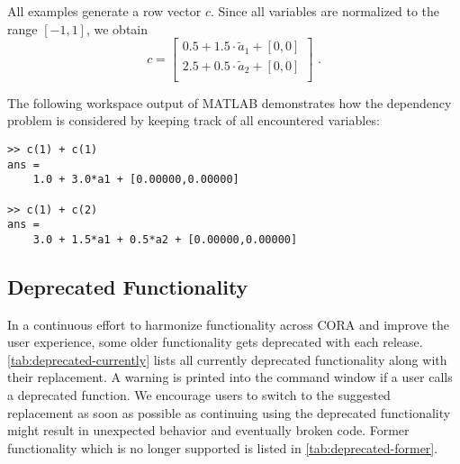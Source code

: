 All examples generate a row vector $c$. Since all variables are normalized to the range $[-1,1]$, we obtain
$$
c =
\begin{bmatrix}
    0.5 + 1.5 \cdot \tilde{a}_1 + [0,0] \\
    2.5 + 0.5 \cdot \tilde{a}_2 + [0,0] \\
\end{bmatrix}
\text{~.}
$$

The following workspace output of MATLAB demonstrates how the dependency problem is considered by keeping track of all encountered variables:
\begin{Verbatim}[samepage=true]
>> c(1) + c(1)
ans = 
	1.0 + 3.0*a1 + [0.00000,0.00000]

>> c(1) + c(2)
ans = 
	3.0 + 1.5*a1 + 0.5*a2 + [0.00000,0.00000]
\end{Verbatim}

\subsection{Deprecated Functionality}\label{sec:deprecated-functionality}

In a continuous effort to harmonize functionality across CORA and improve the user experience,
some older functionality gets deprecated with each release.
\cref{tab:deprecated-currently} lists all currently deprecated functionality along with their replacement.
A warning is printed into the command window if a user calls a deprecated function.
We encourage users to switch to the suggested replacement as soon as possible
as continuing using the deprecated functionality might result in unexpected behavior and eventually broken code.
Former functionality which is no longer supported is listed in \cref{tab:deprecated-former}.

